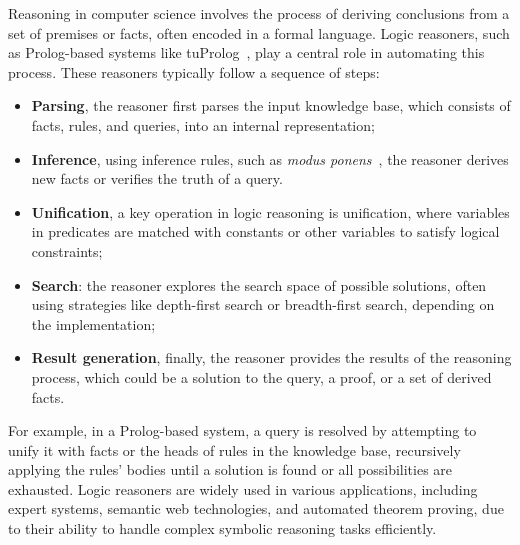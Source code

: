 Reasoning in computer science involves the process of deriving conclusions from a set of premises or facts, often encoded in a formal language.
%
Logic reasoners, such as Prolog-based systems like tuProlog~\cite{DBLP:conf/padl/DentiOR01}, play a central role in automating this process.
%
These reasoners typically follow a sequence of steps:
%
\begin{itemize}
    \item \textbf{Parsing}, the reasoner first parses the input knowledge base, which consists of facts, rules, and queries, into an internal representation;
    \item \textbf{Inference}, using inference rules, such as \emph{modus ponens}~\cite{DBLP:books/daglib/0076838}, the reasoner derives new facts or verifies the truth of a query.
    \item \textbf{Unification}, a key operation in logic reasoning is unification, where variables in predicates are matched with constants or other variables to satisfy logical constraints;
    \item \textbf{Search}: the reasoner explores the search space of possible solutions, often using strategies like depth-first search or breadth-first search, depending on the implementation;
    \item \textbf{Result generation}, finally, the reasoner provides the results of the reasoning process, which could be a solution to the query, a proof, or a set of derived facts.
\end{itemize}
%
For example, in a Prolog-based system, a query is resolved by attempting to unify it with facts or the heads of rules in the knowledge base, recursively applying the rules' bodies until a solution is found or all possibilities are exhausted.
%
Logic reasoners are widely used in various applications, including expert systems, semantic web technologies, and automated theorem proving, due to their ability to handle complex symbolic reasoning tasks efficiently.



